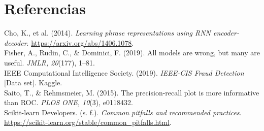 \documentclass[10pt]{article}
\begin{document}
\section*{Referencias}
\footnotesize
Cho, K., et al. (2014). \textit{Learning phrase representations using RNN encoder-decoder}. \url{https://arxiv.org/abs/1406.1078}.\\
Fisher, A., Rudin, C., \& Dominici, F. (2019). All models are wrong, but many are useful. \textit{JMLR, 20}(177), 1--81.\\
IEEE Computational Intelligence Society. (2019). \textit{IEEE-CIS Fraud Detection} [Data set]. Kaggle.\\
Saito, T., \& Rehmsmeier, M. (2015). The precision-recall plot is more informative than ROC. \textit{PLOS ONE, 10}(3), e0118432.\\
Scikit-learn Developers. (s. f.). \textit{Common pitfalls and recommended practices}. \url{https://scikit-learn.org/stable/common_pitfalls.html}.
\end{document}
